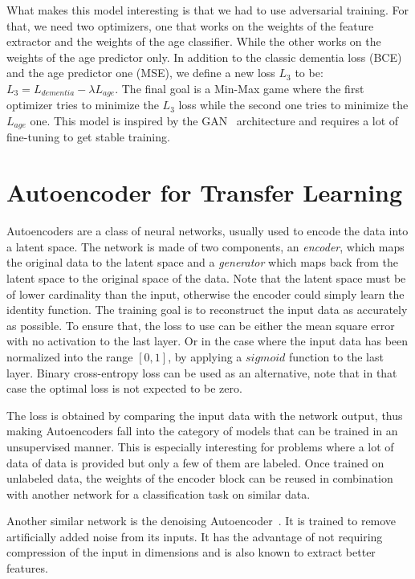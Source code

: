 What makes this model interesting is that we had to use adversarial training. For that, we need two optimizers, one that works on the weights of the feature extractor and the weights of the age classifier. While the other works on the weights of the age predictor only. In addition to the classic dementia loss (BCE) and the age predictor one (MSE), we define a new loss $L_{3}$ to be: $L_3 = L_{dementia} - \lambda L_{age}$. The final goal is a Min-Max game where the first optimizer tries to minimize the $L_3$ loss while the second one tries to minimize the $L_{age}$ one. This model is inspired by the GAN~\cite{goodfellow2014generative} architecture and requires a lot of fine-tuning to get stable training.


\section{Autoencoder for Transfer Learning}
Autoencoders are a class of neural networks, usually used to encode the data into a latent space. The network is made of two components, an \textit{encoder}, which maps the original data to the latent space and a \textit{generator} which maps back from the latent space to the original space of the data. Note that the latent space must be of lower cardinality than the input, otherwise the encoder could simply learn the identity function. The training goal is to reconstruct the input data as accurately as possible. To ensure that, the loss to use can be either the mean square error with no activation to the last layer. Or in the case where the input data has been normalized into the range $[0, 1]$, by applying a $sigmoid$ function to the last layer. Binary cross-entropy loss can be used as an alternative, note that in that case the optimal loss is not expected to be zero.

The loss is obtained by comparing the input data with the network output, thus making Autoencoders fall into the category of models that can be trained in an unsupervised manner. This is especially interesting for problems where a lot of data of data is provided but only a few of them are labeled. Once trained on unlabeled data, the weights of the encoder block can be reused in combination with another network for a classification task on similar data.

Another similar network is the denoising Autoencoder~\cite{denoising_autoencoder_10.5555/1756006.1953039}. It is trained to remove artificially added noise from its inputs. It has the advantage of not requiring compression of the input in dimensions and is also known to extract better features.

